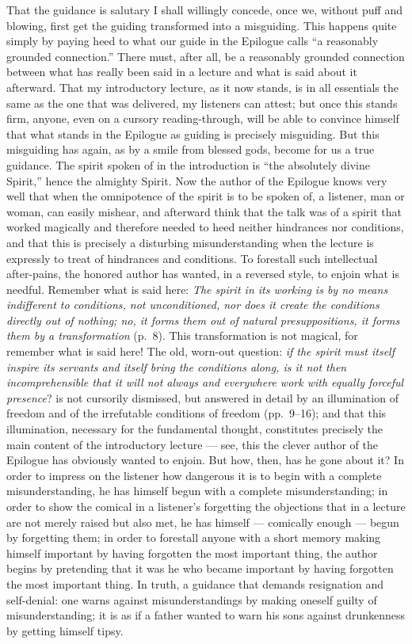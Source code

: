 \documentclass[12pt]{book}
\newcommand{\opage}[1]{\marginnote{\footnotesize\textit{[#1]}}}
\begin{document}
That the guidance is salutary I shall willingly concede, once we,
without puff and blowing, first get the guiding transformed into a
misguiding. This happens quite simply by paying heed to what our guide in
the Epilogue calls ``a reasonably grounded connection.'' There must, after
all, be a reasonably grounded connection between what has really been
said in a lecture and what is said about it afterward. That my
introductory lecture, as it now stands, is in all essentials the same as
the one that was delivered, my listeners can attest; but once this stands
firm, anyone, even on a cursory reading-through, will be able to convince
himself that what stands in the Epilogue as guiding is precisely
misguiding. But this misguiding has again, as by a smile from blessed
gods, become for us a true guidance. The spirit spoken of in the
introduction is ``the absolutely divine Spirit,'' hence the almighty
Spirit. Now the author of the Epilogue knows very well that when the
omnipotence of the spirit is to be spoken of, a listener, man or woman,
can easily mishear, and afterward think that the talk was of a spirit that
worked magically and therefore needed to heed neither hindrances nor
conditions, and that this is precisely a disturbing misunderstanding when
the lecture is expressly to treat of hindrances and conditions. To
forestall such intellectual after-pains, the honored author has wanted,
in a reversed style, to enjoin what is needful. Remember what is said
here:
\opage{314}\setcounter{footnote}{0}%
\emph{The spirit in its working is by no means indifferent to conditions,
not unconditioned, nor does it create the conditions directly out of
nothing; no, it forms them out of natural presuppositions, it forms them
by a transformation} (p.~8). This transformation is not magical, for
remember what is said here! The old, worn-out question: \emph{if the
spirit must itself inspire its servants and itself bring the conditions
along, is it not then incomprehensible that it will not always and
everywhere work with equally forceful presence}? is not cursorily
dismissed, but answered in detail by an illumination of freedom and of
the irrefutable conditions of freedom (pp.~9--16); and that this
illumination, necessary for the fundamental thought, constitutes precisely
the main content of the introductory lecture --- see, this the clever
author of the Epilogue has obviously wanted to enjoin. But how, then, has
he gone about it? In order to impress on the listener how dangerous it is
to begin with a complete misunderstanding, he has himself begun with a
complete misunderstanding; in order to show the comical in a listener's
forgetting the objections that in a lecture are not merely raised but
also met, he has himself --- comically enough --- begun by forgetting
them; in order to forestall anyone with a short memory making himself
important by having forgotten the most important thing, the author begins
by pretending that it was he who became important by having forgotten
the most important thing. In truth, a guidance that demands resignation
and self-denial: one warns against misunderstandings by making oneself
guilty of misunderstanding; it is as if a father wanted to warn his sons
against drunkenness by getting himself tipsy.
\end{document}
